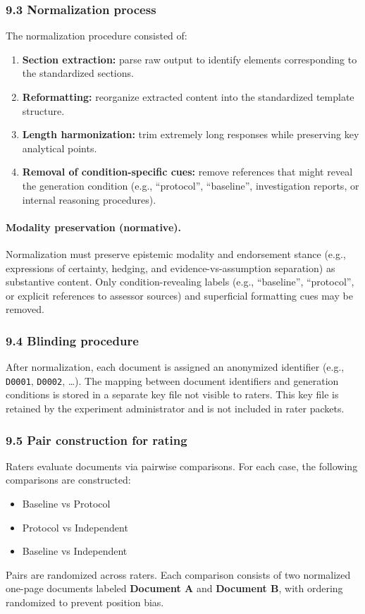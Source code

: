 {\subsubsection*{9.3 Normalization process}
The normalization procedure consisted of:
\begin{enumerate}
  \item \textbf{Section extraction:} parse raw output to identify elements corresponding to the standardized sections.
  \item \textbf{Reformatting:} reorganize extracted content into the standardized template structure.
  \item \textbf{Length harmonization:} trim extremely long responses while preserving key analytical points.
  \item \textbf{Removal of condition-specific cues:} remove references that might reveal the generation condition (e.g., ``protocol'',
        ``baseline'', investigation reports, or internal reasoning procedures).
\end{enumerate}
\paragraph{Modality preservation (normative).}
Normalization must preserve epistemic modality and endorsement stance (e.g., expressions of certainty, hedging, and
evidence-vs-assumption separation) as substantive content. Only condition-revealing labels (e.g., ``baseline'',
``protocol'', or explicit references to assessor sources) and superficial formatting cues may be removed.
\subsubsection*{9.4 Blinding procedure}
After normalization, each document is assigned an anonymized identifier (e.g., \texttt{D0001}, \texttt{D0002}, \dots). The mapping between
document identifiers and generation conditions is stored in a separate key file not visible to raters. This key file is retained by the
experiment administrator and is not included in rater packets.

\subsubsection*{9.5 Pair construction for rating}
Raters evaluate documents via pairwise comparisons. For each case, the following comparisons are constructed:
\begin{itemize}
  \item Baseline vs Protocol
  \item Protocol vs Independent
  \item Baseline vs Independent
\end{itemize}
Pairs are randomized across raters. Each comparison consists of two normalized one-page documents labeled \textbf{Document A} and \textbf{Document B},
with ordering randomized to prevent position bias.
}
